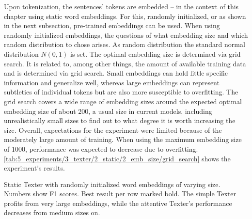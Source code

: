 Upon tokenization, the sentences' tokens are embedded -- in the context of this chapter using static word embeddings. For this, randomly initialized, or as shown in the next subsection, pre-trained embeddings can be used. When using randomly initialized embeddings, the questions of what embedding size and which random distribution to chose arises. As random distribution the standard normal distribution $N(0, 1)$ is set. The optimal embedding size is determined via grid search. It is related to, among other things, the amount of available training data and is determined via grid search. Small embeddings can hold little specific information and generalize well, whereas large embeddings can represent subtleties of individual tokens but are also more susceptible to overfitting. The grid search covers a wide range of embedding sizes around the expected optimal embedding size of about 200, a usual size in current models, including unrealistically small sizes to find out to what degree it is worth increasing the size. Overall, expectations for the experiment were limited because of the moderately large amount of training. When using the maximum embedding size of 1000, performance was expected to decrease due to overfitting. \autoref{tab:5_experiments/3_texter/2_static/2_emb_size/grid_search} shows the experiment's results.

\begin{table}[t]
    \centering
    
    \caption{Static Texter with randomly initialized word embeddings of varying size. Numbers show F1 scores. Best result per row marked bold. The simple Texter profits from very large embeddings, while the attentive Texter's performance decreases from medium sizes on.}
    \label{tab:5_experiments/3_texter/2_static/2_emb_size/grid_search}
\end{table}

